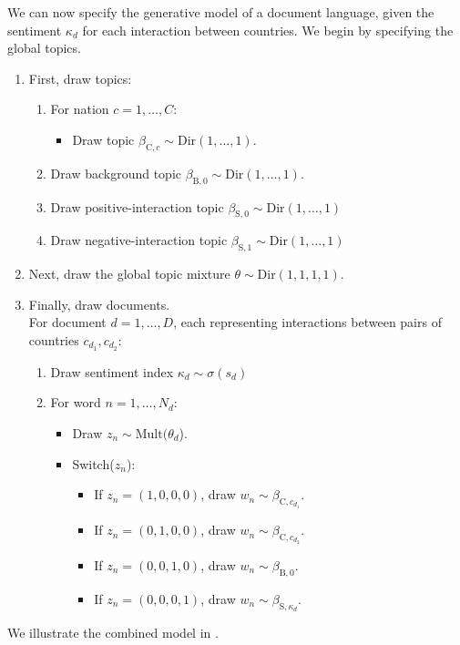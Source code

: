 We can now specify the generative model of a document language, given
the sentiment $\kappa_d$ for each interaction between countries.  We
begin by specifying the global topics.
\begin{enumerate}
\item First, draw topics:
  \begin{enumerate}
  \item For nation $c=1, \ldots, C$:
    \begin{itemize}
    \item Draw topic $\beta_{\mbox{C},c} \sim \mbox{Dir}(1, \ldots, 1)$.
    \end{itemize}
  \item Draw background topic $\beta_{\mbox{B},0} \sim \mbox{Dir}(1, \ldots, 1)$.
  \item Draw positive-interaction topic $\beta_{\mbox{S},0} \sim \mbox{Dir}(1, \ldots, 1)$
  \item Draw negative-interaction topic $\beta_{\mbox{S},1} \sim \mbox{Dir}(1, \ldots, 1)$
\end{enumerate}

\item Next, draw the global topic mixture $\theta \sim \mbox{Dir}(1, 1, 1, 1)$.

\item Finally, draw documents. \\
For document $d=1, \ldots, D$, each representing interactions between pairs of countries $c_{d_1},c_{d_2}$:
  \begin{enumerate}
    \item Draw sentiment index $\kappa_d \sim \sigma(s_d)$
    \item For word $n = 1, \ldots, N_d$:
    \begin{itemize}
      \item Draw $z_{n} \sim \mbox{Mult}(\theta_d$).
      \item Switch($z_n$):
      \begin{itemize}
        \item If $z_n = (1, 0, 0, 0)$, draw $w_n \sim \beta_{\mbox{C},c_{d_1}}$.
        \item If $z_n = (0, 1, 0, 0)$, draw $w_n \sim \beta_{\mbox{C},c_{d_2}}$.
        \item If $z_n = (0, 0, 1, 0)$, draw $w_n \sim \beta_{\mbox{B},0}$.
        \item If $z_n = (0, 0, 0, 1)$, draw $w_n \sim \beta_{\mbox{S},\kappa_d}$.
      \end{itemize}
    \end{itemize}
  \end{enumerate}
\end{enumerate}
We illustrate the combined model in
.

